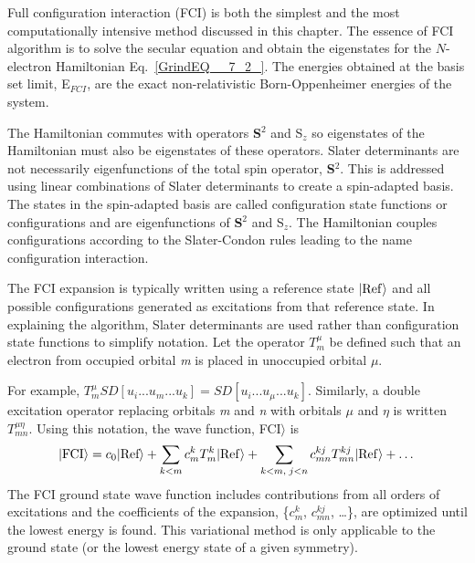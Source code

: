 \documentclass[11pt,oneside,final]{huthesis}%
\begin{document}
Full configuration interaction (FCI) is both the simplest and the most computationally intensive method discussed in this chapter. The essence of FCI algorithm is to solve the secular equation and obtain the eigenstates for the $N$-electron Hamiltonian Eq.~\eqref{GrindEQ__7_2_}.  The energies obtained at the basis set limit, E${}_{FCI}$, are the exact non-relativistic Born-Oppenheimer energies of the system. 

The Hamiltonian commutes with operators \textbf{S}${}^{2}$ and S${}_{z}$ so eigenstates of the Hamiltonian must also be eigenstates of these operators.   Slater determinants are not necessarily eigenfunctions of the total spin operator, \textbf{S}${}^{2}$.  This is addressed using linear combinations of Slater determinants to create a spin-adapted basis. The states in the spin-adapted basis are called {configuration state functions} or {configurations} and are eigenfunctions of \textbf{S}${}^{2}$ and S${}_{z}$. The Hamiltonian couples configurations according to the Slater-Condon rules leading to the name configuration interaction.

The FCI expansion is typically written using a reference state $|{\rm Ref}\rangle $ and all possible configurations generated as excitations from that reference state.  In explaining the algorithm,  Slater determinants are used rather than configuration state functions to simplify notation. Let the operator $T_{m}^{\mu } $ be defined such that an electron from occupied orbital \textit{m} is placed in unoccupied orbital $\mu$.

For example, $T_{m}^{\mu } SD[u_{i} ...u_{m} ...u_{k} ]=SD[u_{i} ...u_{\mu } ...u_{k} ].$ Similarly, a double excitation operator replacing orbitals \textit{m} and \textit{n} with orbitals $\mu$ and $\eta$ is written $T_{mn}^{\mu \eta } $.  Using this notation, the wave function, \textbar FCI$\rangle$ is
\begin{equation} \label{GrindEQ__7_17_} 
{\left| {\rm FCI} \right\rangle} =c_0|\textrm{Ref}\rangle+\sum _{k<m}c_{m}^{k}  T_{m}^{k} {\left| {\rm Ref} \right\rangle} +\sum _{k<m,\; j<n}c_{mn}^{kj}  T_{mn}^{kj} {\left| {\rm Ref} \right\rangle} +\dots%
\end{equation} 
The FCI ground state wave function includes contributions from all orders of excitations and the coefficients of the expansion, \{$c_{m}^{k} $, $c_{mn}^{kj} $, \dots \}, are optimized until the lowest energy is found.  This variational method is only applicable to the ground state (or the lowest energy state of a given symmetry).
\end{document}
